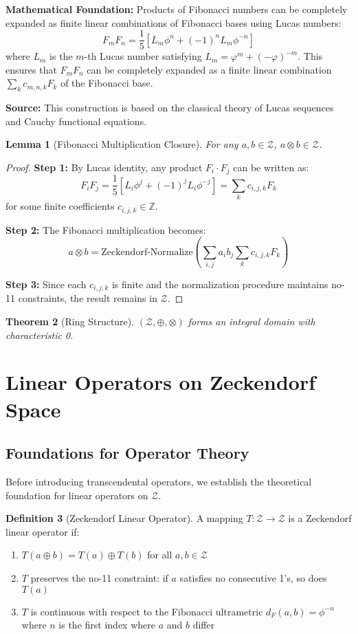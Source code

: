 \documentclass[12pt]{article}
\theoremstyle{plain}
\newtheorem{theorem}{Theorem}[section]
\newtheorem{lemma}[theorem]{Lemma}
\theoremstyle{definition}
\newtheorem{definition}[theorem]{Definition}
\begin{document}
\textbf{Mathematical Foundation:} Products of Fibonacci numbers can be completely expanded as finite linear combinations of Fibonacci bases using Lucas numbers:
$$F_m F_n = \frac{1}{5}\left[L_m \phi^n + (-1)^n L_m \phi^{-n}\right]$$
where $L_m$ is the $m$-th Lucas number satisfying $L_m = \varphi^m + (-\varphi)^{-m}$. This ensures that $F_mF_n$ can be completely expanded as a finite linear combination $\sum_k c_{m,n,k}F_k$ of the Fibonacci base.

\textbf{Source:} This construction is based on the classical theory of Lucas sequences and Cauchy functional equations.

\begin{lemma}[Fibonacci Multiplication Closure]
For any $a, b \in \mathcal{Z}$, $a \otimes b \in \mathcal{Z}$.
\end{lemma}

\begin{proof}
\textbf{Step 1:} By Lucas identity, any product $F_i \cdot F_j$ can be written as:
$$F_i F_j = \frac{1}{5}\left[L_i \phi^j + (-1)^j L_i \phi^{-j}\right] = \sum_{k} c_{i,j,k} F_k$$
for some finite coefficients $c_{i,j,k} \in \mathbb{Z}$.

\textbf{Step 2:} The Fibonacci multiplication becomes:
$$a \otimes b = \text{Zeckendorf-Normalize}\left(\sum_{i,j} a_i b_j \sum_{k} c_{i,j,k} F_k\right)$$

\textbf{Step 3:} Since each $c_{i,j,k}$ is finite and the normalization procedure maintains no-11 constraints, the result remains in $\mathcal{Z}$.
\end{proof}

\begin{theorem}[Ring Structure]
$(\mathcal{Z}, \oplus, \otimes)$ forms an integral domain with characteristic 0.
\end{theorem}

\section{Linear Operators on Zeckendorf Space}

\subsection{Foundations for Operator Theory}

Before introducing transcendental operators, we establish the theoretical foundation for linear operators on $\mathcal{Z}$.

\begin{definition}[Zeckendorf Linear Operator]
A mapping $T: \mathcal{Z} \to \mathcal{Z}$ is a Zeckendorf linear operator if:
\begin{enumerate}
\item $T(a \oplus b) = T(a) \oplus T(b)$ for all $a, b \in \mathcal{Z}$
\item $T$ preserves the no-11 constraint: if $a$ satisfies no consecutive 1's, so does $T(a)$
\item $T$ is continuous with respect to the Fibonacci ultrametric $d_F(a,b) = \phi^{-n}$ where $n$ is the first index where $a$ and $b$ differ
\end{enumerate}
\end{definition}
\end{document}
